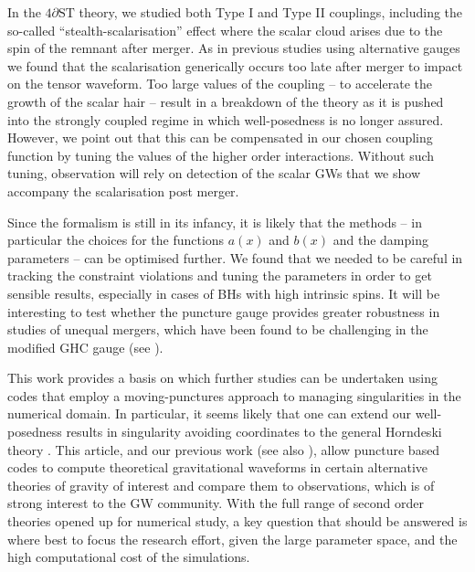 \documentclass[reprint,aps,amsmath,amssymb,twoside,prd,showkeys,superscriptaddress,nofootinbib]{revtex4-2}
\begin{document}
In the $4\partial \text{ST}$ theory, we studied both Type I and Type II couplings, including the so-called ``stealth-scalarisation'' effect where the scalar cloud arises due to the spin of the remnant after merger. As in previous studies using alternative gauges we found that the scalarisation generically occurs too late after merger to impact on the tensor waveform. Too large values of the coupling -- to accelerate the growth of the scalar hair -- result in a breakdown of the theory as it is pushed into the strongly coupled regime in which well-posedness is no longer assured. However, we point out that this can be compensated in our chosen coupling function by tuning the values of the higher order interactions. Without such tuning, observation will rely on detection of the scalar GWs that we show accompany the scalarisation post merger.

Since the formalism is still in its infancy, it is likely that the methods -- in particular the choices for the functions $a(x)$ and $b(x)$ and the damping parameters -- can be optimised further. We found that we needed to be careful in tracking the constraint violations and tuning the parameters in order to get sensible results, especially in cases of BHs with high intrinsic spins. It will be interesting to test whether the puncture gauge provides greater robustness in studies of unequal mergers, which have been found to be challenging in the modified GHC gauge (see \cite{Corman:2022xqg}). 

This work provides a basis on which further studies can be undertaken using codes that employ a moving-punctures approach to managing singularities in the numerical domain. In particular, it seems likely that one can extend our well-posedness results in singularity avoiding coordinates to the general Horndeski theory \cite{Kovacs:2020pns,Kovacs:2020ywu}. 
This article, and our previous work \cite{AresteSalo:2022hua} (see also \cite{Cayuso:2023aht}), allow puncture based codes to compute theoretical gravitational waveforms in certain alternative theories of gravity of interest and compare them to observations, which is of strong interest to the GW community.
With the full range of second order theories opened up for numerical study, a key question that should be answered is where best to focus the research effort, given the large parameter space, and the high computational cost of the simulations.
\end{document}
